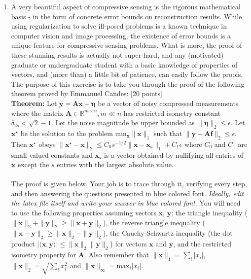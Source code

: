 \documentclass[11pt]{article}
\begin{document}
\begin{enumerate}
\item A very beautiful aspect of compressive sensing is the rigorous mathematical basis - in the form of concrete error bounds on reconstruction results. While using regularization to solve ill-posed problems is a known technique in computer vision and image processing, the existence of error bounds is a unique feature for compressive sensing problems. What is more, the proof of these stunning results is actually not super-hard, and any (motivated) graduate or undergraduate student with a basic knowledge of properties of vectors, and (more than) a little bit of patience, can easily follow the proofs. The purpose of this exercise is to take you through the proof of the following theorem proved by Emmanuel Candes: \textsf{[20 points]}
\\
\textbf{Theorem:} Let $\mathbf{y} = \mathbf{Ax}+\mathbf{\eta}$ be a vector of noisy compressed measurements where the matrix $\mathbf{A} \in \mathbb{R}^{m \times n},  m \ll n$ has restricted isometry constant $\delta_{2s} < \sqrt{2}-1$. Let the noise magnitude be upper bounded as $\|\mathbf{\eta}\|_2 \leq \epsilon$. Let $\mathbf{x}^{\star}$ be the solution to the problem $\textrm{min}_{\mathbf{x}} \|\mathbf{x}\|_1$ such that $\|\mathbf{y} - \mathbf{Af}\|_2 \leq \epsilon$. Then $\mathbf{x^{\star}}$ obeys 
$\|\mathbf{x^{\star} - x}\|_2 \leq C_0 s^{-1/2}\|\mathbf{x - x_s}\|_1  + C_1 \epsilon$ where $C_0$ and $C_1$ are small-valued constants and $\mathbf{x_s}$ is a vector obtained by nullifying all entries of $\mathbf{x}$ except the $s$ entries with the largest absolute value. 
\\
\\
The proof is given below. Your job is to trace through it, verifying every step, and then answering the questions presented in blue colored font. \emph{Ideally, edit the latex file itself and write your answer in blue colored font}.
You will need to use the following properties assuming vectors $\mathbf{x}$, $\mathbf{y}$: the triangle inequality ($\|\mathbf{x}\|_2 + \|\mathbf{y}\|_2 \geq \|\mathbf{x}+\mathbf{y}\|_2$), the reverse triangle inequality ($\|\mathbf{x}-\mathbf{y}\|_2 \geq \|\mathbf{x}\|_2 - \|\mathbf{y}\|_2$), the Cauchy-Schwartz inequality (the dot product $|\langle \mathbf{x}, \mathbf{y} \rangle| \leq \|\mathbf{x}\|_2 \|\mathbf{y}\|_2$) for vectors $\mathbf{x}$ and $\mathbf{y}$, and the restricted isometry property for $\mathbf{A}$. Also remember that $\|\mathbf{x}\|_1 = \sum_i |x_i|$, $\|\mathbf{x}\|_2 = \sqrt{\sum_i x^2_i}$ and $\|\mathbf{x}\|_{\infty} = \textrm{max}_i |x_i|$.

\end{enumerate}
\end{document}
